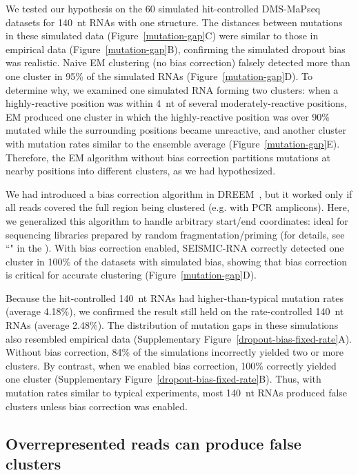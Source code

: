 \documentclass[unnumsec,webpdf,contemporary,large]{oup-authoring-template}%
\theoremstyle{thmstyleone}%
\theoremstyle{thmstyletwo}%
\theoremstyle{thmstylethree}%
\begin{document}
We tested our hypothesis on the 60 simulated hit-controlled DMS-MaPseq datasets for 140~nt RNAs with one structure.
The distances between mutations in these simulated data (Figure~\ref{mutation-gap}C) were similar to those in empirical data (Figure~\ref{mutation-gap}B), confirming the simulated dropout bias was realistic.
Naive EM clustering (no bias correction) falsely detected more than one cluster in 95\% of the simulated RNAs (Figure~\ref{mutation-gap}D).
To determine why, we examined one simulated RNA forming two clusters: when a highly-reactive position was within 4~nt of several moderately-reactive positions, EM produced one cluster in which the highly-reactive position was over 90\% mutated while the surrounding positions became unreactive, and another cluster with mutation rates similar to the ensemble average (Figure~\ref{mutation-gap}E).
Therefore, the EM algorithm without bias correction partitions mutations at nearby positions into different clusters, as we had hypothesized.

We had introduced a bias correction algorithm in DREEM~\cite{Tomezsko2020}, but it worked only if all reads covered the full region being clustered (e.g. with PCR amplicons).
Here, we generalized this algorithm to handle arbitrary start/end coordinates: ideal for sequencing libraries prepared by random fragmentation/priming (for details, see ``" in the ).
With bias correction enabled, SEISMIC-RNA correctly detected one cluster in 100\% of the datasets with simulated bias, showing that bias correction is critical for accurate clustering (Figure~\ref{mutation-gap}D).

Because the hit-controlled 140~nt RNAs had higher-than-typical mutation rates (average 4.18\%), we confirmed the result still held on the rate-controlled 140~nt RNAs (average 2.48\%).
The distribution of mutation gaps in these simulations also resembled empirical data (Supplementary Figure~\ref{dropout-bias-fixed-rate}A).
Without bias correction, 84\% of the simulations incorrectly yielded two or more clusters.
By contrast, when we enabled bias correction, 100\% correctly yielded one cluster (Supplementary Figure~\ref{dropout-bias-fixed-rate}B).
Thus, with mutation rates similar to typical experiments, most 140~nt RNAs produced false clusters unless bias correction was enabled.


\subsection{Overrepresented reads can produce false clusters}
\label{jackpotting-section}
\end{document}
